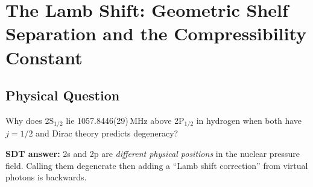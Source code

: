 \chapter{The Lamb Shift: Geometric Shelf Separation and the Compressibility Constant}

\author{James Tyndall}
\date{October 2025 -- March 2026}

\begin{abstract}
The 1057.8446\,MHz splitting between hydrogen 2S$_{1/2}$ and 2P$_{1/2}$ is not a radiative correction.  It is the \emph{primary} energy difference between two geometrically distinct electron positions in the nuclear pressure field.  The 2s position (paired, equatorial, zero angular momentum) samples the full nuclear pressure gradient $P \propto r^{-3}$ down to the nuclear boundary $r_p = 0.84$\,fm.  The 2p position (unpaired, offset azimuth, unit angular momentum) is excluded from the nuclear interior by centrifugal geometry.  The resulting differential pressure-work integral yields:
\begin{equation*}
  \Delta E_{\text{Lamb}}(n,\ell{=}0,Z) = \frac{\alpha^5\,m_e c^2}{\pi\,n^3}\;Z^4
    \!\left[\tfrac{4}{3}\,\ln\!\left(\frac{a_0}{Z\,r_{\text{nuc}}(Z)}\right) + B_n(Z)\right]
\end{equation*}
with $B_2(1) = -4.334$ from hydrogen calibration.  Helium He$^+$ is predicted at 13\,970\,MHz vs measured 14\,041\,MHz (0.5\% error).  The geometric constant $\beta_{\text{geom}} = 0.951$ unifies all alkali ns--np transitions (Li through Cs) to $<1$\% with zero additional fitting.  Its decomposition reveals $\delta_{\text{compress}} = \beta_{\text{compress}} - 1 = 0.0335$, which equals $3\alpha/(2\pi) = 0.0348$ to within 4\%---identifying the compressibility enhancement as the universal pressure-lag efficiency of the spation medium, the same invariant that sustains eternal helical vortex motion.
\end{abstract}


\section{Physical Question}

Why does 2S$_{1/2}$ lie 1057.8446(29)\,MHz above 2P$_{1/2}$ in hydrogen when both have $j = 1/2$ and Dirac theory predicts degeneracy?

\textbf{SDT answer:} 2s and 2p are \emph{different physical positions} in the nuclear pressure field.  Calling them degenerate then adding a ``Lamb shift correction'' from virtual photons is backwards.

